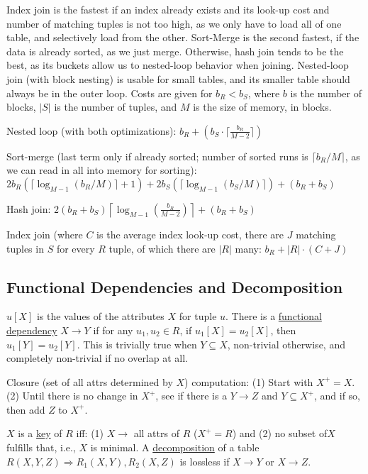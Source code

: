 \documentclass[10pt,letterpaper,twocolumn]{article}
\begin{document}
Index join is the fastest if an index already exists
and its look-up cost and number of matching tuples
is not too high, as we only have to load all of
one table, and selectively load from the other. 
Sort-Merge is the second fastest, 
if the data is already sorted, as we just merge. 
Otherwise, hash join tends to be the best, as its
buckets allow us to nested-loop behavior when joining.
Nested-loop join (with block nesting) is usable for 
small tables, and its smaller table should always
be in the outer loop. 
Costs are given for $ b_R < b_S $, where $ b $ is 
the number of blocks, $ |S| $ is the number of tuples,
and $ M $ is the size of memory, in blocks.

Nested loop (with both optimizations):
$ b_R + (b_S \cdot \lceil\frac{b_R}{M-2}\rceil) $

Sort-merge (last term only if already sorted;
number of sorted runs is $ \lceil b_R/M \rceil $, 
as we can 
read in all into memory for sorting): 
$ 2 b_R(\lceil \log_{M-1}(b_R/M) \rceil + 1)
    + 2 b_S(\lceil \log_{M-1}(b_S/M) \rceil)
    + (b_R + b_S) $


Hash join: 
$ 2(b_R + b_S)
    \left\lceil 
        \log_{M-1}\left(\frac{b_R}{M-2}\right)
    \right\rceil
  + (b_R + b_S) $

Index join (where $ C $ is the average index look-up
cost, there are $ J $ matching tuples in $ S $ 
for every $ R $ tuple, of which there are $ |R| $ many:
$ b_R + |R| \cdot (C + J) $





\subsection{Functional Dependencies and Decomposition}

$ u[X] $ is the values of the attributes $ X $ 
for tuple $ u $. There is a \underline{functional 
dependency} $ X \to Y $ if for any $ u_1, u_2 \in R $, 
if $ u_1[X] = u_2[X] $, then $ u_1[Y] = u_2[Y] $.
This is trivially true when $ Y \subseteq X $,
non-trivial otherwise, and completely non-trivial
if no overlap at all. 

Closure (set of all attrs determined by $ X $)
computation: (1) Start with $ X^+ = X $. (2) Until
there is no change in $ X^+ $, see if there is a 
$ Y \to Z $ and $ Y \subseteq X^+ $, and if so, 
then add $ Z $ to $ X^+ $.

$ X $ is a \underline{key} of $ R $ iff: 
(1) $ X \to $ all attrs of $ R $ ($ X^+ = R $) and 
(2) no subset of$ X $ fulfills that, i.e., 
$ X $ is minimal. A \underline{decomposition}
of a table $ R(X, Y, Z) \Rightarrow R_1(X,Y), 
R_2(X,Z) $ is lossless if $ X \to Y $ or $ X \to Z $. 
\end{document}
